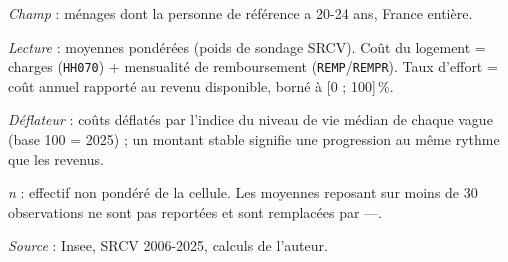 \documentclass[12pt,a4paper]{article}
\begin{document}
\begin{table}[htbp]
\begin{threeparttable}
\begin{tabular}{lrrrrrrrrrr}
			\bottomrule
		\end{tabular}
		\begin{tablenotes}[flushleft]\scriptsize
			\item \textit{Champ} : ménages dont la personne de référence a 20-24 ans, France entière.
			\item \textit{Lecture} : moyennes pondérées (poids de sondage SRCV). Coût du logement =
			charges (\texttt{HH070}) + mensualité de remboursement (\texttt{REMP}/\texttt{REMPR}).
			Taux d'effort = coût annuel rapporté au revenu disponible, borné à [0 ; 100]\,\%.
			\item \textit{Déflateur} : coûts déflatés par l'indice du niveau de vie médian de chaque vague (base 100 = 2025) ; un montant stable signifie une progression au même rythme que les revenus.
			\item \textit{n} : effectif non pondéré de la cellule. Les moyennes reposant sur
			moins de 30 observations ne sont pas reportées et sont remplacées par ---.
			\item \textit{Source} : Insee, SRCV 2006-2025, calculs de l'auteur.
		\end{tablenotes}
	\end{threeparttable}
\end{table}
\end{document}
